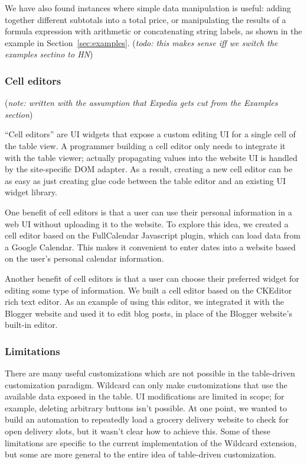\documentclass[sigplan,10pt,anonymous,review]{acmart}
\begin{document}
We have also found instances where simple data manipulation is useful:
adding together different subtotals into a total price, or manipulating
the results of a formula expression with arithmetic or concatenating
string labels, as shown in the example in Section~\ref{sec:examples}.
(\emph{todo: this makes sense iff we switch the examples sectino to HN})

\hypertarget{cell-editors}{%
\subsubsection{Cell editors}\label{cell-editors}}

(\emph{note: written with the assumption that Expedia gets cut from the
Examples section})

``Cell editors'' are UI widgets that expose a custom editing UI for a
single cell of the table view. A programmer building a cell editor only
needs to integrate it with the table viewer; actually propagating values
into the website UI is handled by the site-specific DOM adapter. As a
result, creating a new cell editor can be as easy as just creating glue
code between the table editor and an existing UI widget library.

One benefit of cell editors is that a user can use their personal
information in a web UI without uploading it to the website. To explore
this idea, we created a cell editor based on the FullCalendar Javascript
plugin, which can load data from a Google Calendar. This makes it
convenient to enter dates into a website based on the user's personal
calendar information.

Another benefit of cell editors is that a user can choose their
preferred widget for editing some type of information. We built a cell
editor based on the CKEditor rich text editor. As an example of using
this editor, we integrated it with the Blogger website and used it to
edit blog posts, in place of the Blogger website's built-in editor.

\hypertarget{limitations}{%
\subsubsection{Limitations}\label{limitations}}

There are many useful customizations which are not possible in the
table-driven customization paradigm. Wildcard can only make
customizations that use the available data exposed in the table. UI
modifications are limited in scope; for example, deleting arbitrary
buttons isn't possible. At one point, we wanted to build an automation
to repeatedly load a grocery delivery website to check for open delivery
slots, but it wasn't clear how to achieve this. Some of these
limitations are specific to the current implementation of the Wildcard
extension, but some are more general to the entire idea of table-driven
customization.
\end{document}
